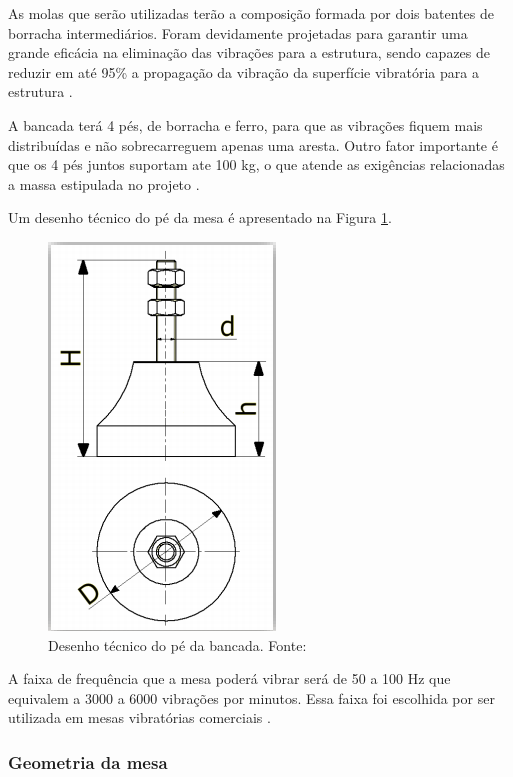 As molas que serão utilizadas terão a composição formada por dois batentes de borracha intermediários. Foram devidamente projetadas para garantir uma 
grande eficácia na eliminação das vibrações para a estrutura, sendo capazes de reduzir em até 95\% a propagação da vibração da superfície vibratória para 
a estrutura \cite{mola_catalogo}.

A bancada terá 4 pés, de borracha e ferro, para que as vibrações fiquem mais distribuídas e não sobrecarreguem apenas uma aresta. 
Outro fator importante é que os 4 pés juntos suportam ate 100 kg, o que atende as exigências relacionadas a massa estipulada no 
projeto \cite{ferramentas_kennedy}.

Um desenho técnico do pé da mesa é apresentado na Figura \ref{fig:pe_bancada}.

    \begin{figure}[!ht]
      \centering
      \includegraphics[scale=0.5]{figuras/amortecedor.png}
      \caption{Desenho técnico do pé da bancada. Fonte: \cite{mola_catalogo}}
      \label{fig:pe_bancada}
      \end{figure}

A faixa de frequência que a mesa poderá vibrar será de 50 a 100 Hz que equivalem a 3000 a 6000 vibrações por minutos. Essa faixa foi 
escolhida por ser utilizada em mesas vibratórias comerciais \cite{ricardo_jose}.

\subsubsection*{\textbf{Geometria da mesa}}

